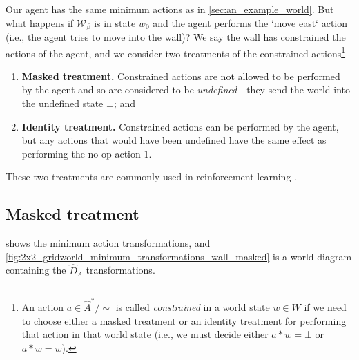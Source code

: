 Our agent has the same minimum actions as in \cref{sec:an_example_world}.
But what happens if $\mathscr{W}_{\beta}$ is in state $w_{0}$ and the agent performs the `move east` action (i.e., the agent tries to move into the wall)?
We say the wall has constrained the actions of the agent, and we consider two treatments of the constrained actions\footnote{
An action $a \in \hat{A}^{*}/\sim$ is called \emph{constrained} in a world state $w \in W$ if we need to choose either a masked treatment or an identity treatment for performing that action in that world state (i.e., we must decide either $a * w = \bot$ or $a * w = w$).
}
\begin{enumerate}
    \item \textbf{Masked treatment.}
    Constrained actions are not allowed to be performed by the agent and so are considered to be \emph{undefined} - they send the world into the undefined state $\bot$; and
    \item \textbf{Identity treatment.}
    Constrained actions can be performed by the agent, but any actions that would have been undefined have the same effect as performing the no-op action $1$.
\end{enumerate}
These two treatments are commonly used in reinforcement learning .

\subsection{Masked treatment}


 shows the minimum action transformations, and \cref{fig:2x2_gridworld_minimum_transformations_wall_masked} is a world diagram containing the $\hat{D}_{A}$ transformations.

